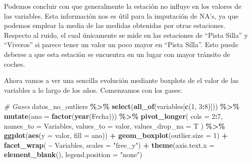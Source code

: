 \documentclass[notspecified,article,submit,moreauthors,pdftex]{Definitions/mdpi}
\newenvironment{Shaded}{\begin{snugshade}}{\end{snugshade}}
\newcommand{\AttributeTok}[1]{\textcolor[rgb]{0.13,0.29,0.53}{#1}}
\newcommand{\CommentTok}[1]{\textcolor[rgb]{0.56,0.35,0.01}{\textit{#1}}}
\newcommand{\DecValTok}[1]{\textcolor[rgb]{0.00,0.00,0.81}{#1}}
\newcommand{\FunctionTok}[1]{\textcolor[rgb]{0.13,0.29,0.53}{\textbf{#1}}}
\newcommand{\NormalTok}[1]{#1}
\newcommand{\SpecialCharTok}[1]{\textcolor[rgb]{0.81,0.36,0.00}{\textbf{#1}}}
\newcommand{\StringTok}[1]{\textcolor[rgb]{0.31,0.60,0.02}{#1}}
\begin{document}
Podemos concluir con que generalmente la estación no influye en los
valores de las variables. Esta información nos es útil para la
imputación de NA's, ya que podemos emplear la media de las medidas
obtenidas por otras estaciones. Respecto al ruido, el cual únicamente se
mide en las estaciones de ``Pista Silla'' y ``Viveros'' si parece tener
un valor un poco mayor en ``Pista Silla''. Esto puede deberse a que esta
estación se encuentra en un lugar con mayor tránsito de coches.

Ahora vamos a ver una sencilla evolución mediante boxplots de el valor
de las variables a lo largo de los años. Comenzamos con los gases:

\begin{Shaded}
\begin{Highlighting}[]
\CommentTok{\# Gases}
\NormalTok{datos\_no\_outliers }\SpecialCharTok{\%\textgreater{}\%}
  \FunctionTok{select}\NormalTok{(}\FunctionTok{all\_of}\NormalTok{(variables[}\FunctionTok{c}\NormalTok{(}\DecValTok{1}\NormalTok{, }\DecValTok{3}\SpecialCharTok{:}\DecValTok{8}\NormalTok{)])) }\SpecialCharTok{\%\textgreater{}\%}
  \FunctionTok{mutate}\NormalTok{(}\AttributeTok{ano =} \FunctionTok{factor}\NormalTok{(}\FunctionTok{year}\NormalTok{(Fecha))) }\SpecialCharTok{\%\textgreater{}\%}
  \FunctionTok{pivot\_longer}\NormalTok{(}
    \AttributeTok{cols =} \DecValTok{2}\SpecialCharTok{:}\DecValTok{7}\NormalTok{,}
    \AttributeTok{names\_to =} \StringTok{\textquotesingle{}Variables\textquotesingle{}}\NormalTok{,}
    \AttributeTok{values\_to =} \StringTok{\textquotesingle{}valor\textquotesingle{}}\NormalTok{,}
    \AttributeTok{values\_drop\_na =}\NormalTok{ T}
\NormalTok{  ) }\SpecialCharTok{\%\textgreater{}\%}
  \FunctionTok{ggplot}\NormalTok{(}\FunctionTok{aes}\NormalTok{(}\AttributeTok{y =}\NormalTok{ valor, }\AttributeTok{fill =}\NormalTok{ ano)) }\SpecialCharTok{+}
  \FunctionTok{geom\_boxplot}\NormalTok{(}\AttributeTok{outlier.size =} \DecValTok{1}\NormalTok{) }\SpecialCharTok{+}
  \FunctionTok{facet\_wrap}\NormalTok{( }\SpecialCharTok{\textasciitilde{}}\NormalTok{ Variables, }\AttributeTok{scales =} \StringTok{"free\_y"}\NormalTok{) }\SpecialCharTok{+}
  \FunctionTok{theme}\NormalTok{(}\AttributeTok{axis.text.x =} \FunctionTok{element\_blank}\NormalTok{(), }\AttributeTok{legend.position =} \StringTok{"none"}\NormalTok{)}
\end{Highlighting}
\end{Shaded}
\end{document}
